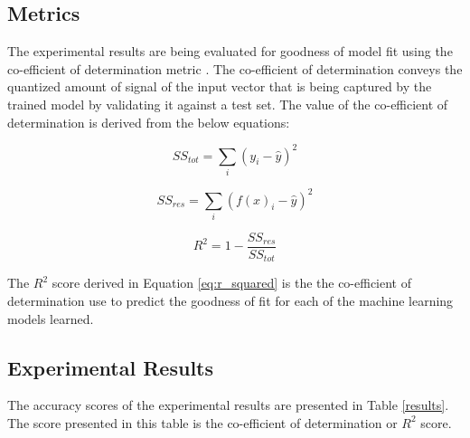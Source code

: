 \documentclass[conference]{IEEEtran}
\begin{document}
    \subsection{Metrics}
        The experimental results are being evaluated for goodness of model fit using the co-efficient of determination metric \cite{jaeger1990statistics}.
        The co-efficient of determination conveys the quantized amount of signal of the input vector that is being captured by the trained model by validating it against a test set. 
        The value of the co-efficient of determination is derived from the below equations:

        \begin{equation}
            \displaystyle SS_{tot} = \sum_{i} (y_i - \hat{y})^2
        \end{equation}

        \begin{equation}
            \displaystyle SS_{res} = \sum_{i} (f(x)_i - \hat{y})^2
        \end{equation}

        \begin{equation} \label{eq:r_squared}
            \displaystyle R^2 = 1 - \frac{SS_{res}}{SS_{tot}}
        \end{equation}

        The $R^2$ score derived in Equation \ref{eq:r_squared} is the the co-efficient of determination use to predict the goodness of fit for each of the machine learning models learned.


    \subsection{Experimental Results}
        The accuracy scores of the experimental results are presented in Table \ref{results}. The score presented in this table is the co-efficient of determination or $R^2$ score.

        \begin{table}[ht] \caption{Evaluation results} \label{results}
            \centering
        \end{table}
\end{document}
